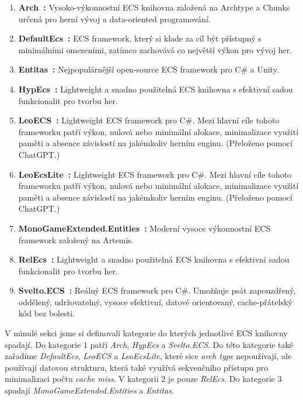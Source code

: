 \begin{enumerate}
    \item \textbf{Arch~\cite{Arch}:} Vysoko-výkonnostní ECS knihovna založená na Archtype a Chunks určená pro herní vývoj a data-oriented programování.
    \item \textbf{DefaultEcs~\cite{DefaultEcs}:} ECS framework, který si klade za cíl být přístupný s minimálními omezeními, zatímco zachovává co největší výkon pro vývoj her.
    \item \textbf{Entitas~\cite{Entitas}:} Nejpopulárnější open-source ECS framework pro C\# a Unity.
    \item \textbf{HypEcs~\cite{HypEcs}:} Lightweight a snadno použitelná ECS knihovna s efektivní sadou funkcionalit pro tvorbu her.
    \item \textbf{LeoECS~\cite{LeoECS}:} Lightweight ECS framework pro C\#. Mezi hlavní cíle tohoto frameworku patří výkon, nulová nebo minimální alokace, minimalizace využití paměti a absence závislostí na jakémkoliv herním enginu. (Přeloženo pomocí ChatGPT.)
    \item \textbf{LeoEcsLite~\cite{LeoEcsLite}:} Lightweight ECS framework pro C\#. Mezi hlavní cíle tohoto frameworku patří výkon, nulová nebo minimální alokace, minimalizace využití paměti a absence závislostí na jakémkoliv herním enginu. (Přeloženo pomocí ChatGPT.)
    \item \textbf{MonoGameExtended.Entities~\cite{MonoGameExtended}:} Moderní vysoce výkonnostní ECS framework založený na Artemis.
    \item \textbf{RelEcs~\cite{RelEcs}:} Lightweight a snadno použitelná ECS knihovna s efektivní sadou funkcionalit pro tvorbu her.
    \item \textbf{Svelto.ECS~\cite{SveltoECS}:} Reálný ECS framework pro C\#. Umožňuje psát zapouzdřený, oddělený, udržovatelný, vysoce efektivní, datově orientovaný, cache-přátelský kód bez bolesti.
\end{enumerate}

V minulé sekci jsme si definovali kategorie do kterých jednotlivé ECS knihovny spadají. Do kategorie 1 patří \textit{Arch}, \textit{HypEcs} a \textit{Svelto.ECS}. Do této kategorie také zařadíme \textit{DefaultEcs}, \textit{LeoECS} a \textit{LeoEcsLite}, které sice \textit{arch type} nepoužívají, ale používají datovou strukturu, která také využívá sekvenčního přístupu pro minimalizaci počtu \textit{cache miss}. V kategorii 2 je pouze \textit{RelEcs}. Do kategorie 3 spadají \textit{MonoGameExtended.Entities} a \textit{Entitas}.


